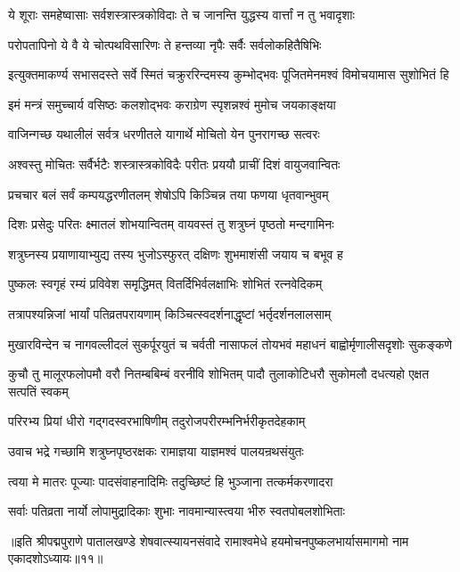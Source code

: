 \twolineshloka
{ये शूराः समहेष्वासाः सर्वशस्त्रास्त्रकोविदाः}
{ते च जानन्ति युद्धस्य वार्त्तां न तु भवादृशाः}%

\twolineshloka
{परोपतापिनो ये वै ये चोत्पथविसारिणः}
{ते हन्तव्या नृपैः सर्वैः सर्वलोकहितैषिभिः}%

\twolineshloka
{इत्युक्तमाकर्ण्य सभासदस्ते सर्वे स्मितं चक्रुररिन्दमस्य}
{कुम्भोद्भवः पूजितमेनमश्वं विमोचयामास सुशोभितं हि}%

\twolineshloka
{इमं मन्त्रं समुच्चार्य वसिष्ठः कलशोद्भवः}
{कराग्रेण स्पृशन्नश्वं मुमोच जयकाङ्क्षया}%

\twolineshloka
{वाजिन्गच्छ यथालीलं सर्वत्र धरणीतले}
{यागार्थे मोचितो येन पुनरागच्छ सत्वरः}%

\twolineshloka
{अश्वस्तु मोचितः सर्वैर्भटैः शस्त्रास्त्रकोविदैः}
{परीतः प्रययौ प्राचीं दिशं वायुजवान्वितः}%

\twolineshloka
{प्रचचार बलं सर्वं कम्पयद्धरणीतलम्}
{शेषोऽपि किञ्चिन्न तया फणया धृतवान्भुवम्}%

\twolineshloka
{दिशः प्रसेदुः परितः क्ष्मातलं शोभयान्वितम्}
{वायवस्तं तु शत्रुघ्नं पृष्ठतो मन्दगामिनः}%

\twolineshloka
{शत्रुघ्नस्य प्रयाणायाभ्युद्य तस्य भुजोऽस्फुरत्}
{दक्षिणः शुभमाशंसी जयाय च बभूव ह}%

\twolineshloka
{पुष्कलः स्वगृहं रम्यं प्रविवेश समृद्धिमत्}
{वितर्दिभिर्वलक्षाभिः शोभितं रत्नवेदिकम्}%

\twolineshloka
{तत्रापश्यन्निजां भार्यां पतिव्रतपरायणाम्}
{किञ्चित्स्वदर्शनाद्धृष्टां भर्तृदर्शनलालसाम्}%

\twolineshloka
{मुखारविन्देन च नागवल्लीदलं सुकर्पूरयुतं च चर्वती}
{नासाफलं तोयभवं महाधनं बाह्वोर्मृणालीसदृशोः सुकङ्कणे}%

\twolineshloka
{कुचौ तु मालूरफलोपमौ वरौ नितम्बबिम्बं वरनीवि शोभितम्}
{पादौ तुलाकोटिधरौ सुकोमलौ दधत्यहो एक्षत सत्पतिं स्वकम्}%

\twolineshloka
{परिरभ्य प्रियां धीरो गद्गदस्वरभाषिणीम्}
{तदुरोजपरीरम्भनिर्भरीकृतदेहकाम्}%

\twolineshloka
{उवाच भद्रे गच्छामि शत्रुघ्नपृष्ठरक्षकः}
{रामाज्ञया याज्ञमश्वं पालयन्रथसंयुतः}%

\twolineshloka
{त्वया मे मातरः पूज्याः पादसंवाहनादिमिः}
{तदुच्छिष्टं हि भुञ्जाना तत्कर्मकरणादरा}%

\twolineshloka
{सर्वाः पतिव्रता नार्यो लोपामुद्रादिकाः शुभाः}
{नावमान्यास्त्वया भीरु स्वतपोबलशोभिताः}%

{॥इति श्रीपद्मपुराणे पातालखण्डे शेषवात्स्यायनसंवादे रामाश्वमेधे हयमोचनपुष्कलभार्यासमागमो नाम एकादशोऽध्यायः॥११॥}

